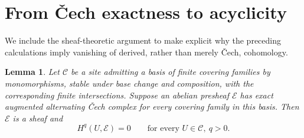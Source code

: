 \documentclass[11pt]{article}
\newtheorem{lemma}[theorem]{Lemma}
\theoremstyle{definition}
\theoremstyle{remark}
\begin{document}
\section{From \v{C}ech exactness to acyclicity}

We include the sheaf-theoretic argument to make explicit why the
preceding calculations imply vanishing of derived, rather than
merely \v{C}ech, cohomology.

\begin{lemma}\label{lem:cech-criterion}
Let \(\mathcal C\) be a site admitting a basis of finite covering
families by monomorphisms, stable under base change and
composition, with the corresponding finite intersections.
Suppose an abelian presheaf \(\mathcal E\) has exact augmented
alternating \v{C}ech complex for every covering family in this
basis. Then \(\mathcal E\) is a sheaf and
\[
H^q(U,\mathcal E)=0
\qquad\text{for every }U\in\mathcal C,\ q>0.
\]
\end{lemma}
\end{document}
